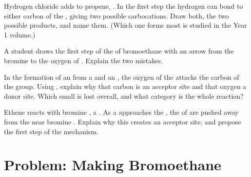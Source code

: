 \begin{exercise}[$\star\star\star$]\label{exo:g12:curly-arrows:12}
Hydrogen chloride adds to propene, . In the first step
the hydrogen  can bond to either carbon of the , giving
two possible carbocations. Draw both, the two possible products, and
name them. (Which one forms most is studied in the Year 1 volume.)
\end{exercise}

\begin{exercise}[$\star\star\star$]\label{exo:g12:curly-arrows:13}
A student draws the first step of the  of bromoethane with an
arrow from the bromine  to the oxygen of . Explain the two
mistakes.
\end{exercise}

\begin{exercise}[$\star\star\star$]\label{exo:g12:curly-arrows:14}
In the formation of an  from a  and an , the
oxygen of the  attacks the carbon of the  group. Using
, explain why that carbon is an acceptor site and that
oxygen a donor site. Which small  is lost overall, and what
category is the whole reaction?
\end{exercise}

\begin{exercise}[$\star\star\star$]\label{exo:g12:curly-arrows:15}
Ethene reacts with bromine , a . As a 
 approaches the , the  of  are
pushed away from the near bromine . Explain why this creates an
acceptor site, and propose the first step of the mechanism.
\end{exercise}

\section{Problem: Making Bromoethane}

